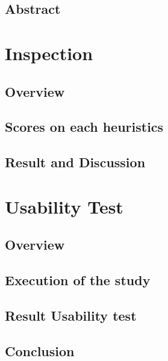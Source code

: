 \documentclass[fontsize=11pt,paper=a4,pagesize=auto]{report}
\begin{document}
\pagebreak
\tableofcontents
\chapter{Abstract}


\part{Inspection}

\chapter{Overview}
 

\chapter{Scores on each heuristics}



\chapter{Result and Discussion}



\part{Usability Test}

\chapter{Overview}


\chapter{Execution of the study}


\chapter{Result Usability test}


\chapter{Conclusion}

\end{document}
